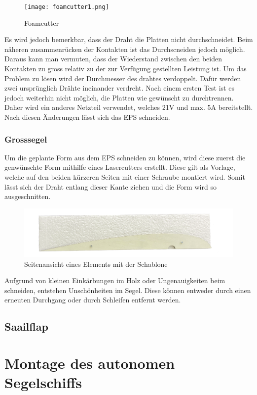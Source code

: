 \begin{figure}[H]
    \centering
    \texttt{[image: foamcutter1.png]}
    \caption{Foamcutter}
    \label{fig:enter-label}
\end{figure}

Es wird jedoch bemerkbar, dass der Draht die Platten nicht durchschneidet. Beim näheren zusammenrücken der Kontakten ist das Durchscneiden jedoch möglich. Daraus kann man vermuten, dass der Wiederstand zwischen den beiden Kontakten zu gross relativ zu der zur Verfügung gestellten Leistung ist. 
Um das Problem zu lösen wird der Durchmesser des drahtes verdoppelt. Dafür werden zwei ursprünglich Drähte ineinander verdreht. Nach einem ersten Test ist es jedoch weiterhin nicht möglich, die Platten wie gewünscht zu durchtrennen. Daher wird ein anderes Netzteil verwendet, welches 21V und max. 5A bereitstellt. Nach diesen Änderungen lässt sich das EPS schneiden. 

\subsubsection*{Grosssegel}
Um die geplante Form aus dem EPS schneiden zu können, wird diese zuerst die genwünschte Form mithilfe eines Lasercutters erstellt. Diese gilt als Vorlage, welche auf den beiden kürzeren Seiten mit einer Schraube montiert wird. Somit lässt sich der Draht entlang dieser Kante ziehen und die Form wird so ausgeschnitten. \\


\begin{figure}[H]
    \centering
    \includegraphics[width=1\linewidth]{assets/template_on_foam.png}
    \caption{Seitenansicht eines Elements mit der Schablone}
    \label{fig:enter-label}
\end{figure}

Aufgrund von kleinen Einkärbungen im Holz oder Ungenauigkeiten beim schneiden, entstehen Unschönheiten im Segel. Diese können entweder durch einen erneuten Durchgang oder durch Schleifen entfernt werden.
\subsection{Saailflap}

\section{Montage des autonomen Segelschiffs}